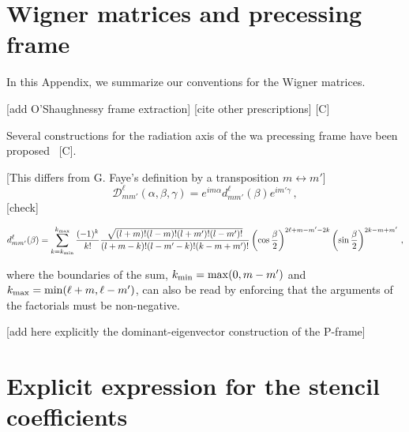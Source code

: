 \documentclass[aps,showpacs,twocolumn,
prd,superscriptaddress,nofootinbib]{revtex4-1}
\newcommand{\be}{\begin{equation}}
\newcommand{\ee}{\end{equation}}
\newcommand\calD{{\mathcal{D}}}
\newcommand{\SM}[1]{{\color{Red} #1}}
\begin{document}

\section{Wigner matrices and precessing frame}
\label{app:wigner}

In this Appendix, we summarize our conventions for the Wigner matrices.

\SM{[add O'Shaughnessy frame extraction]}
\SM{[cite other prescriptions]} \SM{[C]}

Several constructions for the radiation axis of the wa precessing frame have been proposed~\cite{} \SM{[C]}. 

\SM{[This differs from G. Faye's definition by a transposition $m\leftrightarrow m'$]}
\be\label{eq:defWignerDapp}
	\calD^{\ell}_{mm'} (\alpha, \beta, \gamma) = e^{im \alpha} d^{\ell}_{mm'}(\beta) e^{im' \gamma}\,,
\ee
\SM{[check]}
\begin{widetext}
\be\label{eq:defWignerdapp}
	d^{\ell}_{mm'}(\beta) = \sum\limits_{k=k_{\rm min}}^{k_{\rm max}} \frac{(-1)^{k}}{k!} \frac{\sqrt{(l+m)! (l-m)! (l+m')! (l-m')!}}{(l+m-k)! (l-m'-k)! (k-m+m')!} \left( \cos\frac{\beta}{2} \right)^{2\ell+m-m'-2k} \left( \sin\frac{\beta}{2} \right)^{2k-m+m'}\,,
\ee
\end{widetext}
where the boundaries of the sum, $k_{\rm min} = \mathrm{max}(0, m-m')$ and $k_{\rm max} = \mathrm{min}(\ell+m, \ell-m')$, can also be read by enforcing that the arguments of the factorials must be non-negative.

\SM{[add here explicitly the dominant-eigenvector construction of the P-frame]}

\section{Explicit expression for the stencil coefficients}
\label{app:stencil}
\end{document}
